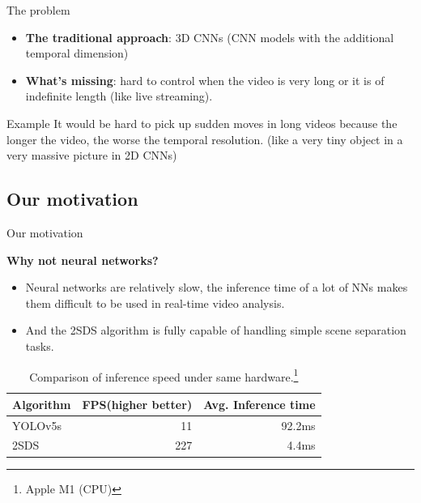 \documentclass[aspectratio=43,display]{beamer}
\begin{document}
		\begin{frame}{The problem}

			\begin{itemize}
				\item \textbf{The traditional approach}: 3D CNNs (CNN models with the additional temporal dimension)
				\item \textbf{What's missing}: hard to control when the video is very long or it is of indefinite length (like live streaming).
			\end{itemize}

			\vskip 0.5cm

			\begin{block}{Example}
				It would be hard to pick up sudden moves in long videos because the longer the video, the worse the temporal resolution.
				(like a very tiny object in a very massive picture in 2D CNNs)
			\end{block}

		\end{frame}


	\subsection{Our motivation}

		\begin{frame}{Our motivation}

			\textbf{Why not neural networks?}

			\begin{itemize}
				\item Neural networks are relatively slow, the inference time of a lot of NNs makes them difficult to be used in real-time video analysis.
				\item And the 2SDS algorithm is fully capable of handling simple scene separation tasks.
			\end{itemize}

			\vskip 0.3cm

			\begin{table}
				\centering
				\begin{tabular}{l|r|r}
				Algorithm & FPS(higher better) & Avg. Inference time\\\hline
				YOLOv5s & 11 & 92.2ms \\
				2SDS & 227 & 4.4ms
				\end{tabular}
			\caption{\label{tab:Speed-Comparision}Comparison of inference speed under same hardware.\footnote{Apple M1 (CPU)}}
			\end{table}

		\end{frame}
\end{document}
